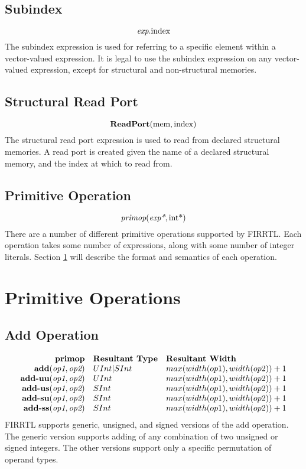\documentclass[12pt]{article}
\begin{document}
\subsection{Subindex}
\[
\text{\em exp}.\text{index}
\]
The subindex expression is used for referring to a specific element within a vector-valued expression.
It is legal to use the subindex expression on any vector-valued expression, except for structural and non-structural memories. 

\subsection{Structural Read Port}
\[
\text{\bf ReadPort}(\text{mem}, \text{index})
\]
The structural read port expression is used to read from declared structural memories.
A read port is created given the name of a declared structural memory, and the index at which to read from. 


\subsection{Primitive Operation}
\[
\text{\em primop}(\text{\em exp*}, \text{int}\text{*})
\]
There are a number of different primitive operations supported by FIRRTL. 
Each operation takes some number of expressions, along with some number of integer literals.
Section \ref{primitives} will describe the format and semantics of each operation.


\section{Primitive Operations} \label{primitives}

\subsection{Add Operation}
\[
\begin{array}{rll}
\text{\bf primop} & \text{\bf Resultant Type} & \text{\bf Resultant Width} \\
\text{\bf add}(   \text{\em op1}, \text{\em op2}) & UInt|SInt & max(width(op1),width(op2)) + 1 \\
\text{\bf add-uu}(\text{\em op1}, \text{\em op2}) & UInt & max(width(op1),width(op2)) + 1 \\
\text{\bf add-us}(\text{\em op1}, \text{\em op2}) & SInt & max(width(op1),width(op2)) + 1 \\
\text{\bf add-su}(\text{\em op1}, \text{\em op2}) & SInt & max(width(op1),width(op2)) + 1 \\
\text{\bf add-ss}(\text{\em op1}, \text{\em op2}) & SInt & max(width(op1),width(op2)) + 1 \\
\end{array}
\]
FIRRTL supports generic, unsigned, and signed versions of the add operation.
The generic version supports adding of any combination of two unsigned or signed integers. The other versions support only a specific permutation of operand types.
\end{document}
